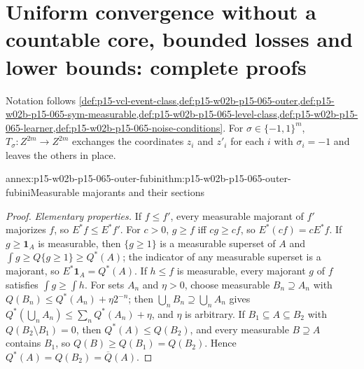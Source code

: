 \section{Uniform convergence without a countable core, bounded losses and lower bounds: complete proofs}
\label{sec:annex-p15-w02b-p15-065-beyond-core}

Notation follows
\cref{def:p15-vcl-event-class,def:p15-w02b-p15-065-outer,def:p15-w02b-p15-065-sym-measurable,def:p15-w02b-p15-065-level-class,def:p15-w02b-p15-065-learner,def:p15-w02b-p15-065-noise-conditions}.
For \(\sigma\in\{-1,1\}^m\), \(T_\sigma:Z^{2m}\to Z^{2m}\) exchanges the
coordinates \(z_i\) and \(z'_i\) for each \(i\) with \(\sigma_i=-1\) and
leaves the others in place.

\begin{annexitem}{annex:p15-w02b-p15-065-outer-fubini}{thm:p15-w02b-p15-065-outer-fubini}{Measurable majorants and their sections}
\begin{proof}
\emph{Elementary properties.} If \(f\leq f'\), every measurable majorant of
\(f'\) majorizes \(f\), so \(E^{*}f\leq E^{*}f'\). For \(c>0\), \(g\geq f\)
iff \(cg\geq cf\), so \(E^{*}(cf)=cE^{*}f\). If \(g\geq\mathbf1_A\) is
measurable, then \(\{g\geq1\}\) is a measurable superset of \(A\) and
\(\int g\geq Q\{g\geq1\}\geq Q^{*}(A)\); the indicator of any measurable
superset is a majorant, so \(E^{*}\mathbf1_A=Q^{*}(A)\). If \(h\leq f\) is
measurable, every majorant \(g\) of \(f\) satisfies \(\int g\geq\int h\).
For sets \(A_n\) and \(\eta>0\), choose measurable \(B_n\supseteq A_n\) with
\(Q(B_n)\leq Q^{*}(A_n)+\eta2^{-n}\); then \(\bigcup_nB_n\supseteq\bigcup_nA_n\)
gives \(Q^{*}(\bigcup_nA_n)\leq\sum_nQ^{*}(A_n)+\eta\), and \(\eta\) is
arbitrary. If \(B_1\subseteq A\subseteq B_2\) with
\(Q(B_2\setminus B_1)=0\), then \(Q^{*}(A)\leq Q(B_2)\), and every measurable
\(B\supseteq A\) contains \(B_1\), so \(Q(B)\geq Q(B_1)=Q(B_2)\). Hence
\(Q^{*}(A)=Q(B_2)=\overline Q(A)\).


\end{proof}
\end{annexitem}
